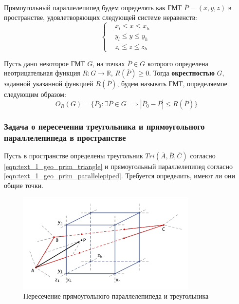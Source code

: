 Прямоугольный параллелепипед будем определять как ГМТ $\overline{P} = (x, y, z)$ в пространстве, удовлетворяющих следующей системе неравенств:
\begin{equation}\label{eqn:text_1_geo_prim_parallelepiped}
	\left\{
		\begin{aligned}
			& x_l \le x \le x_h \\
			& y_l \le y \le y_h \\
			& z_l \le z \le z_h
		\end{aligned}
	\right.
\end{equation}

\begin{definition}
Пусть дано некоторое ГМТ $G$, на точках $\overline{P} \in G$ которого определена неотрицательная функция $R: G \rightarrow \mathbb{R}$, $R(\overline{P}) \ge 0$.
Тогда \textbf{окрестностью}\label{term:envelope} $G$, заданной указанной функцией $R(\overline{P})$, будем называть ГМТ, определяемое следующим образом:
\begin{equation}
	O_R(G) = \{ \overline{P}_0: \exists \overline{P} \in G \implies |\overline{P}_0 - \overline{P}| \le R(\overline{P}) \}
\end{equation}
\end{definition}

\subsubsection{Задача о пересечении треугольника и прямоугольного параллелепипеда в пространстве}

Пусть в пространстве определены треугольник $Tri(\overline{A}, \overline{B}, \overline{C})$ согласно \eqref{eqn:text_1_geo_prim_triangle} и прямоугольный параллелепипед согласно \eqref{eqn:text_1_geo_prim_parallelepiped}.
Требуется определить, имеют ли они общие точки.

\begin{figure}[ht]
	\centering
		\includegraphics[width=0.80\textwidth]{./pics/text_1_geo_prim/tri_block_intersect.pdf}
	\caption{Пересечение прямоугольного параллелепипеда и треугольника}
	\label{fig:text_1_geo_prim_tri_block_intersect}
\end{figure}

